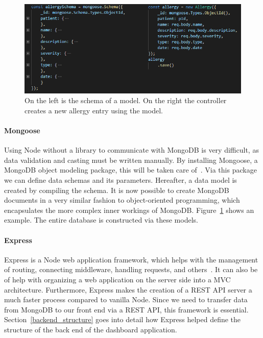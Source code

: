             \begin{figure}[h]
                \centering
                \includegraphics[width=1\textwidth]{chapters/4_implementation/model}
                \caption{On the left is the schema of a model. On the right the controller creates a new allergy entry using the model.}\label{fig:mongoose_model}
            \end{figure}
        

            \paragraph{Mongoose} Using Node without a library to communicate with MongoDB is very difficult, as data validation and casting must be written manually. By installing Mongoose, a MongoDB object modeling package, this will be taken care of~\cite{Mongoose}. Via this package we can define data schemas and its parameters. Hereafter, a data model is created by compiling the schema. It is now possible to create MongoDB documents in a very similar fashion to object-oriented programming, which encapsulates the more complex inner workings of MongoDB\@. Figure~\ref{fig:mongoose_model} shows an example. The entire database is constructed via these models.

            \paragraph{Express} Express is a Node web application framework, which helps with the management of routing, connecting middleware, handling requests, and others~\cite{Express}. It can also be of help with organizing a web application on the server side into a MVC architecture. Furthermore, Express makes the creation of a REST API server a much faster process compared to vanilla Node. Since we need to transfer data from MongoDB to our front end via a REST API, this framework is essential. Section~\ref{backend_structure} goes into detail how Express helped define the structure of the back end of the dashboard application.

